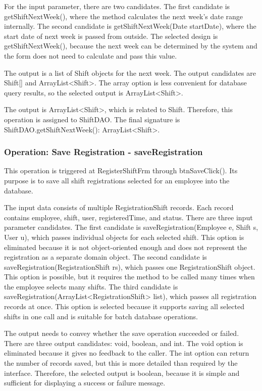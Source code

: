 For the input parameter, there are two candidates. The first candidate is getShiftNextWeek(), where the method calculates the next week's date range internally. The second candidate is getShiftNextWeek(Date startDate), where the start date of next week is passed from outside. The selected design is getShiftNextWeek(), because the next week can be determined by the system and the form does not need to calculate and pass this value.

The output is a list of Shift objects for the next week. The output candidates are Shift[] and ArrayList<Shift>. The array option is less convenient for database query results, so the selected output is ArrayList<Shift>.

The output is ArrayList<Shift>, which is related to Shift. Therefore, this operation is assigned to ShiftDAO. The final signature is ShiftDAO.getShiftNextWeek(): ArrayList<Shift>.

\subsubsection{Operation: Save Registration - saveRegistration}

This operation is triggered at RegisterShiftFrm through btnSaveClick(). Its purpose is to save all shift registrations selected for an employee into the database.

The input data consists of multiple RegistrationShift records. Each record contains employee, shift, user, registeredTime, and status. There are three input parameter candidates. The first candidate is saveRegistration(Employee e, Shift s, User u), which passes individual objects for each selected shift. This option is eliminated because it is not object-oriented enough and does not represent the registration as a separate domain object. The second candidate is saveRegistration(RegistrationShift rs), which passes one RegistrationShift object. This option is possible, but it requires the method to be called many times when the employee selects many shifts. The third candidate is saveRegistration(ArrayList<RegistrationShift> list), which passes all registration records at once. This option is selected because it supports saving all selected shifts in one call and is suitable for batch database operations.

The output needs to convey whether the save operation succeeded or failed. There are three output candidates: void, boolean, and int. The void option is eliminated because it gives no feedback to the caller. The int option can return the number of records saved, but this is more detailed than required by the interface. Therefore, the selected output is boolean, because it is simple and sufficient for displaying a success or failure message.

